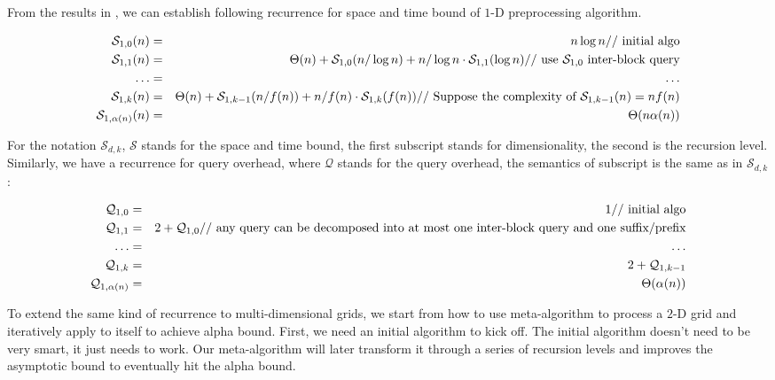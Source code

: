 

From the results in \cite{Yao82, Yao85, Seidel06}, we can establish
following recurrence for space and time bound of $1$-D
preprocessing algorithm.

\begin{eqnarray}
\mathcal{S}_{1, 0} (n) & = & n \log n \hfil \mbox{// initial algo} \\
\mathcal{S}_{1, 1} (n) & = & \Theta(n) + \mathcal{S}_{1, 0}(n/\log n) + n/\log n \cdot \mathcal{S}_{1, 1}(\log n) \hfil \mbox{// use $\mathcal{S}_{1, 0}$ inter-block query}\\
\ldots & = & \ldots \\
\mathcal{S}_{1, k} (n) & = & \Theta(n) + \mathcal{S}_{1, k-1}(n / f(n)) + n/f(n) \cdot \mathcal{S}_{1, k}(f(n)) \hfil \mbox{// Suppose the complexity of $\mathcal{S}_{1, k-1}(n) = n f(n)$} \\ 
\mathcal{S}_{1, \alpha(n)} (n) & = & \Theta(n \alpha (n)) \\ 
\label{eq:meta-1D-S1}
\end{eqnarray}

For the notation $\mathcal{S}_{d, k}$, $\mathcal{S}$ stands for the
space and time bound, the first subscript stands for dimensionality,
the second is the recursion level. Similarly, we have a recurrence
for query overhead, where $\mathcal{Q}$ stands for the query overhead,
the semantics of subscript is the same as in $\mathcal{S}_{d, k}$:

\begin{eqnarray}
\mathcal{Q}_{1, 0} & = & 1 \hfil \mbox{// initial algo}\\
\mathcal{Q}_{1, 1} & = & 2 + \mathcal{Q}_{1, 0} \hfil \mbox{// any query can be decomposed into at most one inter-block query and one suffix/prefix} \\
\ldots & = & \ldots \\
\mathcal{Q}_{1, k} & = & 2 + \mathcal{Q}_{1, k-1} \\
\mathcal{Q}_{1, \alpha(n)} & = & \Theta(\alpha(n))
\label{eq:meta-1D-Q1}
\end{eqnarray}

To extend the same kind of recurrence to multi-dimensional grids,
we start from how to use meta-algorithm to process a $2$-D
grid and iteratively apply to itself to achieve alpha bound. 
First, we need an initial algorithm to kick
off. The initial algorithm doesn't need to be very smart, it just needs
to work. Our meta-algorithm will later transform it through a series
of recursion levels and improves the asymptotic bound to eventually hit
the alpha bound.

